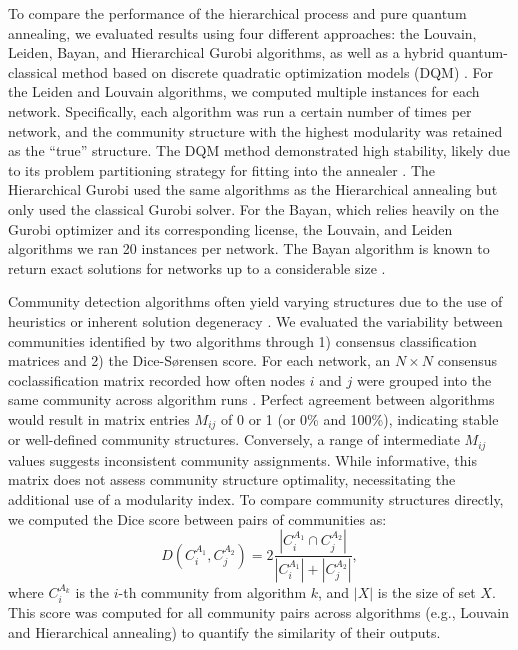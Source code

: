 \documentclass[pdflatex,sn-mathphys-num]{sn-jnl}%
\begin{document}
To compare the performance of the hierarchical process and pure quantum annealing, we evaluated results using four different approaches: the Louvain, Leiden, Bayan, and Hierarchical Gurobi algorithms, as well as a hybrid quantum-classical method based on discrete quadratic optimization models (DQM) \cite{Blondel2008, Traag2019, aref2022, Wierzbinski2023}. For the Leiden and Louvain algorithms, we computed multiple instances for each network. Specifically, each algorithm was run a certain number of times per network, and the community structure with the highest modularity was retained as the ``true'' structure. The DQM method demonstrated high stability, likely due to its problem partitioning strategy for fitting into the annealer \cite{Negre2020, Wierzbinski2023}. The Hierarchical Gurobi used the same algorithms as the Hierarchical annealing but only used the classical Gurobi solver. For the Bayan, which relies heavily on the Gurobi optimizer and its corresponding license, the Louvain, and Leiden algorithms we ran 20 instances per network. The Bayan algorithm is known to return exact solutions for networks up to a considerable size \cite{aref2023}.

Community detection algorithms often yield varying structures due to the use of heuristics or inherent solution degeneracy \cite{fornito2016fundamentals}. We evaluated the variability between communities identified by two algorithms through 1) consensus classification matrices and 2) the Dice-S{\o}rensen score. For each network, an $N \times N$ consensus coclassification matrix recorded how often nodes $i$ and $j$ were grouped into the same community across algorithm runs \cite{Lancichinetti2012}. Perfect agreement between algorithms would result in matrix entries $M_{ij}$ of 0 or 1 (or 0\% and 100\%), indicating stable or well-defined community structures. Conversely, a range of intermediate $M_{ij}$ values suggests inconsistent community assignments. While informative, this matrix does not assess community structure optimality, necessitating the additional use of a modularity index. To compare community structures directly, we computed the Dice score between pairs of communities as:
\begin{equation} \label{eq:dicescore}
    D(C^{A_1}_i,C^{A_2}_j) = 2\frac{|C^{A_1}_i \cap C^{A_2}_j|}{|C^{A_1}_i|+|C^{A_2}_j|},
\end{equation}
where $C^{A_k}_i$ is the $i$-th community from algorithm $k$, and $|X|$ is the size of set $X$. This score was computed for all community pairs across algorithms (e.g., Louvain and Hierarchical annealing) to quantify the similarity of their outputs.
\end{document}
